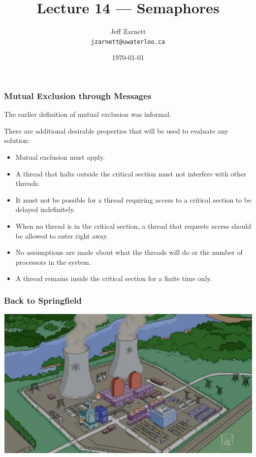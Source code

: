 

\title{Lecture 14 --- Semaphores }

\author{Jeff Zarnett \\ \small \texttt{jzarnett@uwaterloo.ca}}
\date{\today}




\begin{frame}
	\titlepage

\end{frame}

\begin{frame}
	\frametitle{Mutual Exclusion through Messages}

	The earlier definition of mutual exclusion was informal.

	There are additional desirable properties that will be used to evaluate any solution:
	\begin{itemize}
		\item Mutual exclusion must apply.
		\item A thread that halts outside the critical section must not interfere with other threads.
		\item It must not be possible for a thread requiring access to a critical section to be delayed indefinitely.
		\item When no thread is in the critical section, a thread that requests access should be allowed to enter right away.
		\item No assumptions are made about what the threads will do or the number of processors in the system.
		\item A thread remains inside the critical section for a finite time only.
	\end{itemize}


\end{frame}


\begin{frame}
	\frametitle{Back to Springfield}

	\begin{center}
		\includegraphics[width=\textwidth]{images/springfield-plant.png}
	\end{center}


\end{frame}


